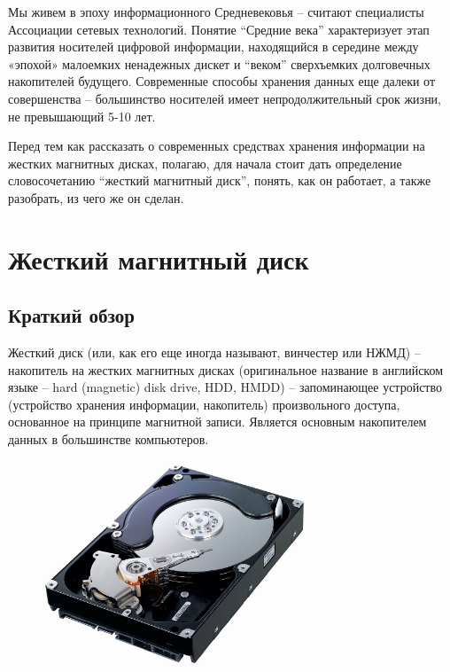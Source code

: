 \documentclass[bachelor, och, referat]{SCWorks}
\begin{document}

\tableofcontents





\intro

Мы живем в эпоху информационного Средневековья -- считают специалисты Ассоциации
сетевых технологий. Понятие ``Средние века'' характеризует этап развития 
носителей цифровой информации, находящийся в середине между «эпохой» малоемких
ненадежных дискет и ``веком'' сверхъемких долговечных накопителей будущего. 
Современные способы хранения данных еще далеки от совершенства -- большинство 
носителей имеет непродолжительный срок жизни, не превышающий 5-10 лет. 

Перед тем как рассказать о современных средствах хранения информации на жестких 
магнитных дисках, полагаю, для начала стоит дать определение словосочетанию 
``жесткий магнитный диск'', понять, как он работает, а также разобрать, из чего 
же он сделан.

\section{Жесткий магнитный диск}

\subsection{Краткий обзор}

Жесткий диск (или, как его еще иногда называют, винчестер или НЖМД) -- 
накопитель на жестких магнитных дисках (оригинальное название в английском 
языке -- hard (magnetic) disk drive, HDD, HMDD) -- запоминающее устройство 
(устройство хранения информации, накопитель) произвольного доступа, основанное 
на принципе магнитной записи. Является основным накопителем данных в 
большинстве компьютеров. 

\begin{figure}[H]
    \centering
    \includegraphics[width=0.7\textwidth]{hdd.png}
    \caption{}
    \label{}
\end{figure}
\end{document}
